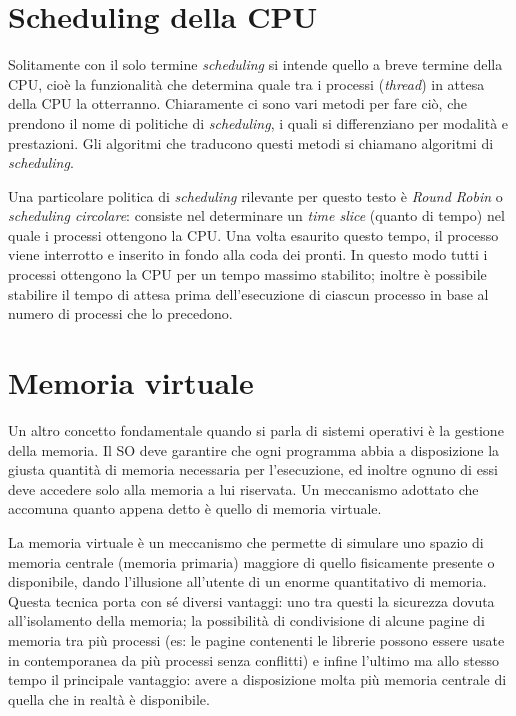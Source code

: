 \section{Scheduling della CPU}
Solitamente con il solo termine \textit{scheduling} si intende quello a breve termine della CPU, cioè la funzionalità che determina quale tra i processi (\textit{thread}) in attesa della CPU la otterranno. Chiaramente ci sono vari metodi per fare ciò, che prendono il nome di politiche di \textit{scheduling}, i quali si differenziano per modalità e prestazioni. Gli algoritmi che traducono questi metodi si chiamano algoritmi di \textit{scheduling}.

Una particolare politica di \textit{scheduling} rilevante per questo testo è \textit{Round Robin} o \textit{scheduling circolare}: consiste nel determinare un \textit{time slice} (quanto di tempo) nel quale i processi ottengono la CPU. Una volta esaurito questo tempo, il processo viene interrotto e inserito in fondo alla coda dei pronti. In questo modo tutti i processi ottengono la CPU per un tempo massimo stabilito; inoltre è possibile stabilire il tempo di attesa prima dell'esecuzione di ciascun processo in base al numero di processi che lo precedono.

\section{Memoria virtuale}
Un altro concetto fondamentale quando si parla di sistemi operativi è la gestione della memoria. Il SO deve garantire che ogni programma abbia a disposizione la giusta quantità di memoria necessaria per l'esecuzione, ed inoltre ognuno di essi deve accedere solo alla memoria a lui riservata. Un meccanismo adottato che accomuna quanto appena detto è quello di memoria virtuale.

La memoria virtuale è un meccanismo che permette di simulare uno spazio di memoria centrale (memoria primaria) maggiore di quello fisicamente presente o disponibile, dando l'illusione all'utente di un enorme quantitativo di memoria. Questa tecnica porta con sé diversi vantaggi: uno tra questi la sicurezza dovuta all'isolamento della memoria; la possibilità di condivisione di alcune pagine di memoria tra più processi (es: le pagine contenenti le librerie possono essere usate in contemporanea da più processi senza conflitti) e infine l'ultimo ma allo stesso tempo il principale vantaggio: avere a disposizione molta più memoria centrale di quella che in realtà è disponibile. 

